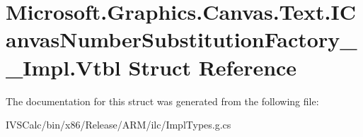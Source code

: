 \hypertarget{struct_microsoft_1_1_graphics_1_1_canvas_1_1_text_1_1_i_canvas_number_substitution_factory_____impl_1_1_vtbl}{}\section{Microsoft.\+Graphics.\+Canvas.\+Text.\+I\+Canvas\+Number\+Substitution\+Factory\+\_\+\+\_\+\+Impl.\+Vtbl Struct Reference}
\label{struct_microsoft_1_1_graphics_1_1_canvas_1_1_text_1_1_i_canvas_number_substitution_factory_____impl_1_1_vtbl}


The documentation for this struct was generated from the following file\+:\begin{DoxyCompactItemize}
\item 
I\+V\+S\+Calc/bin/x86/\+Release/\+A\+R\+M/ilc/Impl\+Types.\+g.\+cs\end{DoxyCompactItemize}
